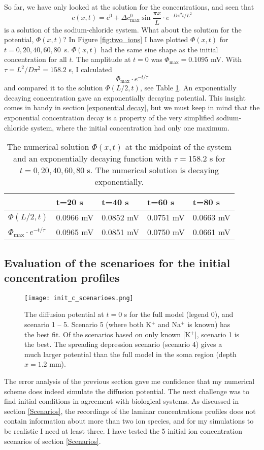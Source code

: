 \documentclass{article}
\begin{document}
So far, we have only looked at the solution for the concentrations, and seen that $$c(x,t) =c^0 + \Delta c^0_{\text{max}} \sin \frac{ \pi x}{L}\cdot e^{-D\pi^2 t /L^2}$$ is a solution of the sodium-chloride system. What about the solution for the potential, $\Phi(x,t)$? In Figure \ref{fig:two_ions} I have plotted $\Phi(x,t)$ for $t=0,20,40,60,80$~s. $\Phi(x,t)$ had the same sine shape as the initial concentration for all $t$. The amplitude at $t=0$ was $\Phi_{\text{max}} = 0.1095$ mV. With $\tau = L^2/D\pi^2 = 158.2$ s, I calculated 
$$\Phi_{\text{max}} \cdot e^{-t/{\tau}}$$ and compared it to the solution $\Phi(L/2,t)$, see Table \ref{tab:error2}. An exponentially decaying concentration gave an exponentially decaying potential. This insight comes in handy in section \ref{exponential decay}, but we must keep in mind that the exponential concentration decay is a property of the very simplified sodium-chloride system, where the initial concentration had only one maximum. 

\begin{table}[h!]
  \centering
  \caption{The numerical solution $\Phi(x,t)$ at the midpoint of the system and an exponentially decaying function with $\tau = 158.2$ s for $t=0,20,40,60,80$ s. The numerical solution is decaying exponentially. }
  \label{tab:error2}
  \begin{tabular}{l||l|l|l|l}
 & t=20 s & t=40 s & t=60 s & t=80 s\\
 \hline
$\Phi(L/2,t)$  & 0.0966 mV &  0.0852 mV & 0.0751 mV & 0.0663 mV\\
\hline
$\Phi_{\text{max}} \cdot e^{-t/{\tau}}$  & 0.0965 mV & 0.0851 mV & 0.0750 mV & 0.0661 mV\\


 \end{tabular}
\end{table}


\subsection{Evaluation of the scenarioes for the initial concentration profiles}\label{The K/Na assumtion}

\begin{figure}
  \texttt{[image: init\_c\_scenarioes.png]}
  \caption{The diffusion potential at $t=0$ s for the full model (legend 0), and scenario 1 -- 5. Scenario 5 (where both K$^+$ and Na$^+$ is known) has the best fit. Of the scenarios based on only known [K$^+$], scenario 1 is the best. The spreading depression scenario (scenario 4) gives a much larger potential than the full model in the soma region (depth $x=1.2$ mm). }
  \label{fig:init_c_scenarioes}
\end{figure}
The error analysis of the previous section gave me confidence that my numerical scheme does indeed simulate the diffusion potential. The next challenge was to find initial conditions in agreement with biological systems. As discussed in section \ref{Scenarios}, the recordings of the laminar concentrations profiles does not contain information about more than two ion species, and for my simulations to be realistic I need at least three. I have tested the 5 initial ion concentration scenarios of section \ref{Scenarios}. 
\end{document}
